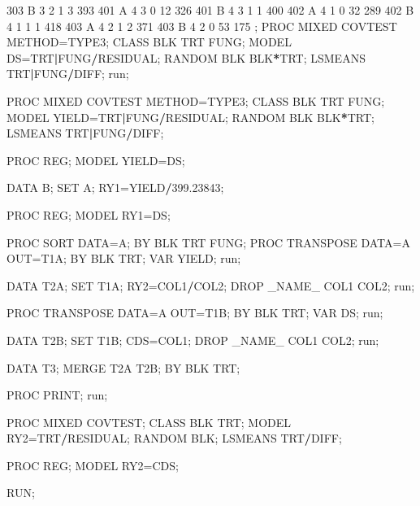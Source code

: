 \documentclass[]{book}
\newenvironment{Shaded}{\begin{snugshade}}{\end{snugshade}}
\newcommand{\DecValTok}[1]{\textcolor[rgb]{0.00,0.00,0.81}{#1}}
\newcommand{\FloatTok}[1]{\textcolor[rgb]{0.00,0.00,0.81}{#1}}
\newcommand{\NormalTok}[1]{#1}
\newcommand{\OperatorTok}[1]{\textcolor[rgb]{0.81,0.36,0.00}{\textbf{#1}}}
\begin{document}
\begin{Shaded}
\begin{Highlighting}[]
\DecValTok{303}\NormalTok{ B   }\DecValTok{3}   \DecValTok{2}   \DecValTok{1}   \DecValTok{3}   \DecValTok{393}
\DecValTok{401}\NormalTok{ A   }\DecValTok{4}   \DecValTok{3}   \DecValTok{0}   \DecValTok{12}  \DecValTok{326}
\DecValTok{401}\NormalTok{ B   }\DecValTok{4}   \DecValTok{3}   \DecValTok{1}   \DecValTok{1}   \DecValTok{400}
\DecValTok{402}\NormalTok{ A   }\DecValTok{4}   \DecValTok{1}   \DecValTok{0}   \DecValTok{32}  \DecValTok{289}
\DecValTok{402}\NormalTok{ B   }\DecValTok{4}   \DecValTok{1}   \DecValTok{1}   \DecValTok{1}   \DecValTok{418}
\DecValTok{403}\NormalTok{ A   }\DecValTok{4}   \DecValTok{2}   \DecValTok{1}   \DecValTok{2}   \DecValTok{371}
\DecValTok{403}\NormalTok{ B   }\DecValTok{4}   \DecValTok{2}   \DecValTok{0}   \DecValTok{53}  \DecValTok{175}
\NormalTok{;}
\NormalTok{PROC MIXED COVTEST METHOD=TYPE3;}
\NormalTok{CLASS BLK TRT FUNG;}
\NormalTok{MODEL DS=TRT}\OperatorTok{|}\NormalTok{FUNG}\OperatorTok{/}\NormalTok{RESIDUAL;}
\NormalTok{RANDOM BLK BLK}\OperatorTok{*}\NormalTok{TRT;}
\NormalTok{LSMEANS TRT}\OperatorTok{|}\NormalTok{FUNG}\OperatorTok{/}\NormalTok{DIFF;}
\NormalTok{run;}

\NormalTok{PROC MIXED COVTEST METHOD=TYPE3;}
\NormalTok{CLASS BLK TRT FUNG;}
\NormalTok{MODEL YIELD=TRT}\OperatorTok{|}\NormalTok{FUNG}\OperatorTok{/}\NormalTok{RESIDUAL;}
\NormalTok{RANDOM BLK BLK}\OperatorTok{*}\NormalTok{TRT;}
\NormalTok{LSMEANS TRT}\OperatorTok{|}\NormalTok{FUNG}\OperatorTok{/}\NormalTok{DIFF;}

\NormalTok{PROC REG;}
\NormalTok{MODEL YIELD=DS;}

\NormalTok{DATA B;}
\NormalTok{SET A;}
\NormalTok{RY1=YIELD}\OperatorTok{/}\FloatTok{399.23843}\NormalTok{;}

\NormalTok{PROC REG;}
\NormalTok{MODEL RY1=DS;}


\NormalTok{PROC SORT DATA=A; BY BLK TRT FUNG;}
\NormalTok{PROC TRANSPOSE DATA=A OUT=T1A; BY BLK TRT;}
\NormalTok{VAR YIELD;}
\NormalTok{run;}

\NormalTok{DATA T2A;}
\NormalTok{SET T1A;}
\NormalTok{RY2=COL1}\OperatorTok{/}\NormalTok{COL2;}
\NormalTok{DROP _NAME_ COL1 COL2;}
\NormalTok{run;}

\NormalTok{PROC TRANSPOSE DATA=A OUT=T1B; BY BLK TRT;}
\NormalTok{VAR DS;}
\NormalTok{run;}

\NormalTok{DATA T2B;}
\NormalTok{SET T1B;}
\NormalTok{CDS=COL1;}
\NormalTok{DROP _NAME_ COL1 COL2;}
\NormalTok{run;}

\NormalTok{DATA T3;}
\NormalTok{MERGE T2A T2B;}
\NormalTok{BY BLK TRT; }

\NormalTok{PROC PRINT;}
\NormalTok{run;}

\NormalTok{PROC MIXED COVTEST;}
\NormalTok{CLASS BLK TRT;}
\NormalTok{MODEL RY2=TRT}\OperatorTok{/}\NormalTok{RESIDUAL;}
\NormalTok{RANDOM BLK;}
\NormalTok{LSMEANS TRT}\OperatorTok{/}\NormalTok{DIFF;}

\NormalTok{PROC REG;}
\NormalTok{MODEL RY2=CDS;}

\NormalTok{RUN;}
\end{Highlighting}
\end{Shaded}
\end{document}
